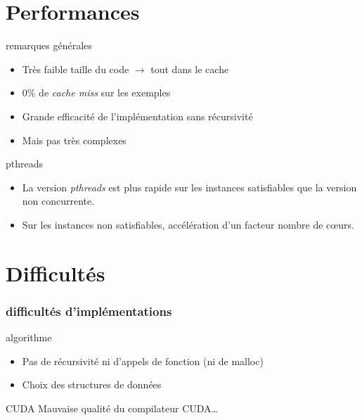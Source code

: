 \documentclass{beamer}
\newcommand{\cuda}{\textsc{CUDA}}
\begin{document}

\section{Performances}

\begin{frame}


\begin{block}{remarques générales}
\begin{itemize}
    \item Très faible taille du code $\rightarrow$ tout dans le cache
    \item 0\% de \emph{cache miss} sur les exemples
    \item Grande efficacité de l'implémentation sans récursivité
    \item Mais pas très complexes
\end{itemize}
\end{block}
\pause
\begin{block}{pthreads}
\begin{itemize}
    \item La version \emph{pthreads} est plus rapide sur les instances satisfiables que la version non concurrente.
    \item Sur les instances non satisfiables, accélération d'un facteur nombre de cœurs.
\end{itemize}
\end{block}

\end{frame}
   

\section{Difficultés}
    
\begin{frame}
\frametitle{difficultés d'implémentations}
\begin{block}{algorithme}
\begin{itemize}
    \item Pas de récursivité ni d'appels de fonction (ni de malloc)
    \item Choix des structures de données
\end{itemize}
\end{block}

\pause

\begin{block}{\cuda}
    Mauvaise qualité du compilateur \cuda{}\ldots{}
\end{block}

\end{frame}
\end{document}
